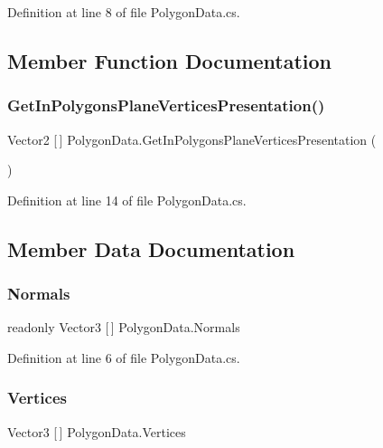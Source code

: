 Definition at line 8 of file Polygon\+Data.\+cs.



\subsection{Member Function Documentation}
\mbox{\label{class_polygon_data_a024ebb4875136879c093b7ba08a8b2c9}} 
\subsubsection{\texorpdfstring{GetInPolygonsPlaneVerticesPresentation()}{GetInPolygonsPlaneVerticesPresentation()}}
{\footnotesize\ttfamily Vector2 \mbox{[}$\,$\mbox{]} Polygon\+Data.\+Get\+In\+Polygons\+Plane\+Vertices\+Presentation (\begin{DoxyParamCaption}{ }\end{DoxyParamCaption})}



Definition at line 14 of file Polygon\+Data.\+cs.



\subsection{Member Data Documentation}
\mbox{\label{class_polygon_data_ad74733d05200dc339426df8e49a9ca6a}} 
\subsubsection{\texorpdfstring{Normals}{Normals}}
{\footnotesize\ttfamily readonly Vector3 \mbox{[}$\,$\mbox{]} Polygon\+Data.\+Normals}



Definition at line 6 of file Polygon\+Data.\+cs.

\mbox{\label{class_polygon_data_ae9dfaa860511424803cd74822927bcac}} 
\subsubsection{\texorpdfstring{Vertices}{Vertices}}
{\footnotesize\ttfamily Vector3 \mbox{[}$\,$\mbox{]} Polygon\+Data.\+Vertices}



